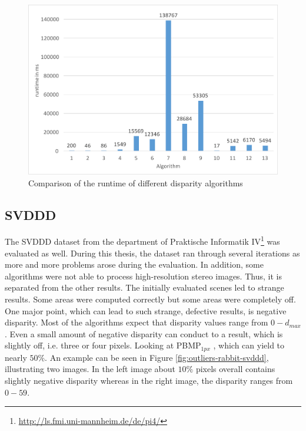 \begin{figure}[h!]
\centering
\includegraphics[width=1.0\textwidth]{src/images/evaluation/plots/runtime.pdf}
\caption[Comparison of the runtime of different disparity algorithms]{Comparison of the runtime of different disparity algorithms}
\label{fig:eval-plots-runtime}
\end{figure}

\subsection{SVDDD}

The SVDDD dataset from the department of Praktische Informatik IV\footnote{\url{http://ls.fmi.uni-mannheim.de/de/pi4/}} was evaluated as well.
During this thesis, the dataset ran through several iterations as more and more problems arose during the evaluation.
In addition, some algorithms were not able to process high-resolution stereo images.
Thus, it is separated from the other results.
\newline\newline\noindent The initially evaluated scenes led to strange results.
Some areas were computed correctly but some areas were completely off.
One major point, which can lead to such strange, defective results, is negative disparity.
Most of the algorithms expect that disparity values range from $0-d_{max}$.
Even a small amount of negative disparity can conduct to a result, which is slightly off, i.e. three or four pixels.
Looking at PBMP$_{1px}$ , which can yield to nearly $50\%$.
An example can be seen in Figure \ref{fig:outliers-rabbit-svddd}, illustrating two images.
In the left image about $10\%$ pixels overall contains slightly negative disparity whereas in the right image, the disparity ranges from $0-59$.

